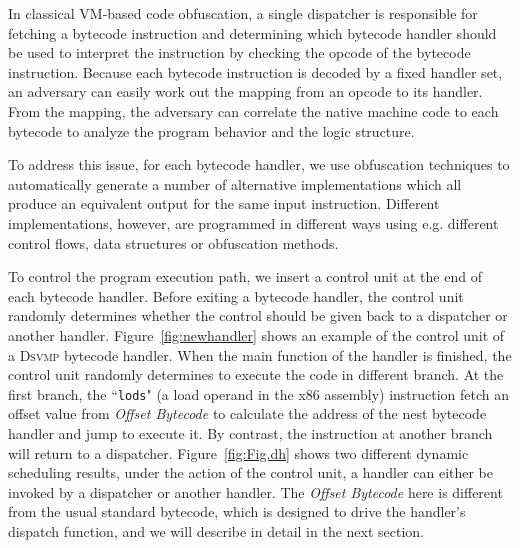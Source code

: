 \documentclass[preprint,12pt,3p]{elsarticle}
\newcommand{\DSVMP}{\textsc{Dsvmp}\xspace}
\begin{document}
In classical VM-based code obfuscation, a single dispatcher is responsible for fetching a bytecode instruction and
determining which bytecode handler should be used to interpret the instruction by checking the opcode of the bytecode
instruction.
Because each bytecode instruction
is decoded by a fixed handler set, an adversary can easily work out the mapping from an opcode to its
handler. From the mapping, the adversary can correlate the native machine code to each bytecode to analyze the
program behavior and  the logic structure.

To address this issue, for each bytecode handler, we use obfuscation techniques to automatically generate a number of alternative implementations which all
produce an equivalent output for the same input instruction. Different implementations, however,
are programmed in different ways using e.g. different control flows, data structures or obfuscation methods.

To control the program execution path, we insert a control unit at the end of each bytecode handler.
Before exiting a bytecode handler, the control unit randomly determines whether the control should be given back to a dispatcher or
another handler.
Figure~\ref{fig:newhandler} shows an example of the control unit of a \DSVMP bytecode handler.
When the main function of the handler is finished, the control unit randomly determines to execute the code in different branch.
At the first branch, the ``\texttt{lods}" (a load operand in the x86 assembly) instruction fetch an offset value from \emph{Offset Bytecode} to calculate the address of the nest bytecode handler and jump to execute it.
By contrast, the instruction at another branch will return to a dispatcher.
Figure~\ref{fig:Fig.dh} shows two different dynamic scheduling results, under the action of the control unit, a handler can either be invoked by a dispatcher or another handler.
The \emph{Offset Bytecode} here is different from the usual standard bytecode, which is designed to drive the handler's dispatch function, and we will describe in detail in the next section.
\end{document}

